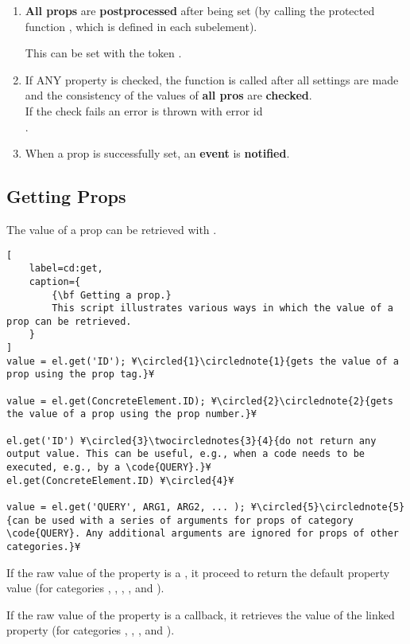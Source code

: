 \documentclass{tufte-handout}
\begin{document}
\begin{enumerate}
	\item {\bf All props} are {\bf postprocessed} after being set (by calling the protected function , which is defined in each subelement).
	
	This can be set with the token .

	\item If ANY property is checked, the function  is called after all settings are made and the consistency of the values of {\bf all pros} are {\bf checked}.\\
	If the check fails an error is thrown with error id\\
	.
	
	\item When a prop is successfully set, an {\bf event}  is {\bf notified}.
\end{enumerate} 

\subsection{Getting Props}

The value of a prop can be retrieved with .
%
\begin{lstlisting}[
	label=cd:get,
	caption={
		{\bf Getting a prop.}
		This script illustrates various ways in which the value of a prop can be retrieved.
	}
]
value = el.get('ID'); ¥\circled{1}\circlednote{1}{gets the value of a prop using the prop tag.}¥

value = el.get(ConcreteElement.ID); ¥\circled{2}\circlednote{2}{gets the value of a prop using the prop number.}¥

el.get('ID') ¥\circled{3}\twocirclednotes{3}{4}{do not return any output value. This can be useful, e.g., when a code needs to be executed, e.g., by a \code{QUERY}.}¥
el.get(ConcreteElement.ID) ¥\circled{4}¥

value = el.get('QUERY', ARG1, ARG2, ... ); ¥\circled{5}\circlednote{5}{can be used with a series of arguments for props of category \code{QUERY}. Any additional arguments are ignored for props of other categories.}¥
\end{lstlisting}

If the raw value of the property is a , it proceed to return the default property value (for categories , , , , and ).
 
If the raw value of the property is a callback, it retrieves the value of the linked property (for categories , , , and ).
 
\end{document}
